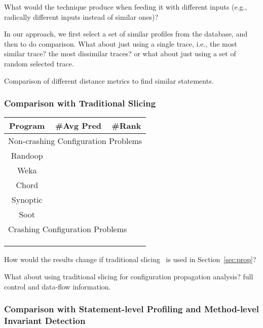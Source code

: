 What would the technique produce when feeding it with different inputs (e.g.,
radically different inputs instead of similar ones)?

In our approach, we first select a set of similar profiles from the  database,
and then to do comparison. What about just using a single trace, i.e., the
most similar trace? the most dissimilar traces? or what about just using a set
of random selected trace.

Comparison of different distance metrics to find similar statements.

\subsubsection{Comparison with Traditional Slicing}
\begin{table}[t]
\setlength{\tabcolsep}{.84\tabcolsep}
\begin{tabular}{|c|c|c|}
\hline
 Program &  \#Avg Pred & \#Rank \\
 \hline
\hline
\multicolumn{3}{|l|}{Non-crashing Configuration Problems}   \\
 \hline
 Randoop & &    \\
\hline
 Weka &  &   \\
\hline
 Chord & & \\
\hline
 Synoptic & &  \\
\hline
 Soot &  &    \\
\hline
\hline
\multicolumn{3}{|l|}{Crashing Configuration Problems}   \\
\hline
& & \\
\hline
& & \\
\hline
& & \\
\hline
\end{tabular}

\end{table}

How would the results change if traditional slicing~\cite{Horwitz:1988} is used
in Section~\ref{sec:prop}?

What about using traditional slicing for configuration propagation analysis?
full control and data-flow information.

\subsubsection{Comparison with Statement-level Profiling and Method-level Invariant Detection}

